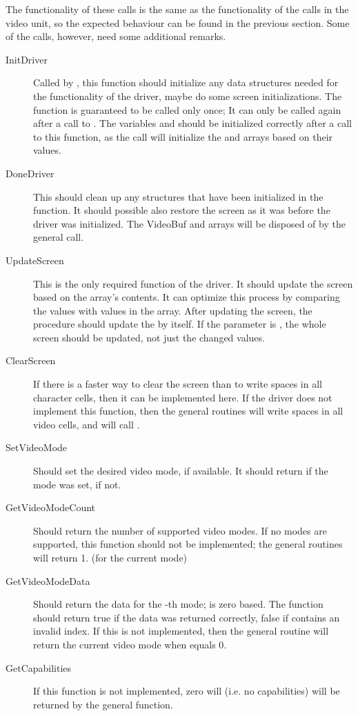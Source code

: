 The functionality of these calls is the same as the functionality of the
calls in the video unit, so the expected behaviour can be found in the
previous section. Some of the calls, however, need some additional remarks.
\begin{description}
\item[InitDriver] Called by , this function should initialize 
any data structures needed for the functionality of the driver, maybe do some 
screen initializations. The function is guaranteed to be called only once; It 
can only be called again after a call to . The variables
 and  should be initialized correctly
after a call to this function, as the  call will initialize
the  and  arrays based on their values.
\item[DoneDriver] This should clean up any structures that have been
initialized in the  function. It should possible also
restore the screen as it was before the driver was initialized. The VideoBuf
and  arrays will be disposed of by the general 
call.
\item[UpdateScreen] This is the only required function of the driver. It
should update the screen based on the  array's contents. It
can optimize this process by comparing the values with values in the
 array. After updating the screen, the 
procedure should update the  by itself. If the 
parameter is , the whole screen should be updated, not just the
changed values.
\item[ClearScreen] If there is a faster way to clear the screen than to
write spaces in all character cells, then it can be implemented here. If the
driver does not implement this function, then the general routines will
write spaces in all video cells, and will call .
\item[SetVideoMode] Should set the desired video mode, if available. It
should return  if the mode was set,  if not.
\item[GetVideoModeCount] Should return the number of supported video modes.
If no modes are supported, this function should not be implemented; the
general routines will return 1. (for the current mode)
\item[GetVideoModeData] Should return the data for the -th mode;
 is zero based. The function should return true if the data was
returned correctly, false if  contains an invalid index.
If this is not implemented, then the general routine will return the current 
video mode when  equals 0.
\item[GetCapabilities] If this function is not implemented, zero will (i.e.
no capabilities) will be returned by the general function.
\end{description}

